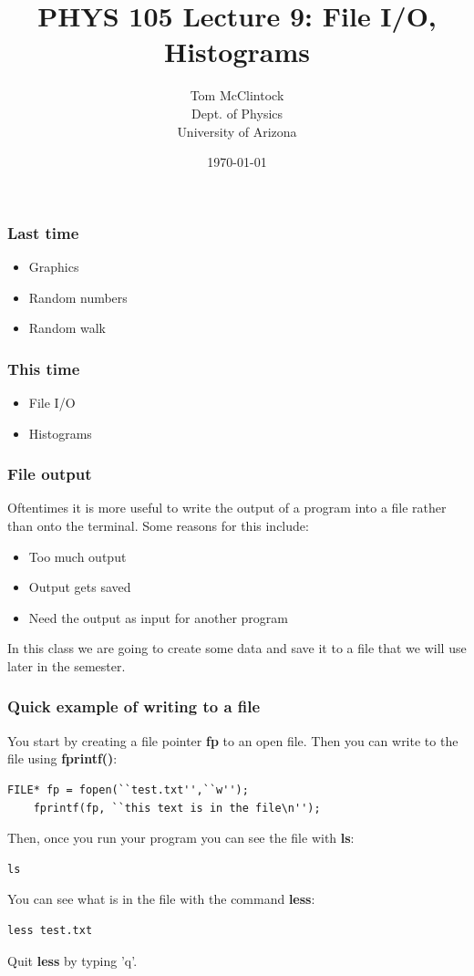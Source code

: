 \documentclass{beamer}
\title{PHYS 105 Lecture 9: File I/O, Histograms}
\author{Tom McClintock \\
	Dept. of Physics\\
	University of Arizona
}
\date{\today}
\begin{document}
\begin{frame}
  \titlepage
\end{frame}

\begin{frame}
  \frametitle{Last time}
  \begin{itemize}
    \item Graphics
    \item Random numbers
    \item Random walk
  \end{itemize}
\end{frame}

\begin{frame}
  \frametitle{This time}
  \begin{itemize}
    \item File I/O
    \item Histograms
  \end{itemize}
\end{frame}

\begin{frame}
  \frametitle{File output}
  Oftentimes it is more useful to write the output of a program into a file
  rather than onto the terminal. Some reasons for this include:
  \begin{itemize}
    \item Too much output
    \item Output gets saved
    \item Need the output as input for another program
  \end{itemize}
  In this class we are going to create some data and save it to a file 
  that we will use later in the semester.
\end{frame}

\begin{frame}[fragile]
  \frametitle{Quick example of writing to a file}
  You start by creating a file pointer \textbf{fp} to an open file.
  Then you can write to the file using \textbf{fprintf()}:
  \begin{lstlisting}[style=customc]
    FILE* fp = fopen(``test.txt'',``w'');
    fprintf(fp, ``this text is in the file\n'');
  \end{lstlisting}
  Then, once you run your program you can see the file with \textbf{ls}:
  \begin{lstlisting}[style=custombash]
    ls
  \end{lstlisting}
  You can see what is in the file with the command \textbf{less}:
  \begin{lstlisting}[style=custombash]
    less test.txt
  \end{lstlisting}
  Quit \textbf{less} by typing 'q'.
\end{frame}
\end{document}
